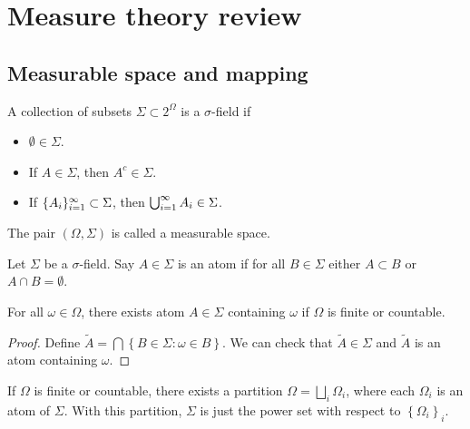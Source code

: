 \documentclass[a4paper]{article}
\author{Notes taken by \nauthor\vspace{5pt}\\
Lectures by Konstantin Tikhomirov\vspace{5pt}\\
Carnegie Mellon University}
\begin{document}
\maketitle

\tableofcontents

\section{Measure theory review}

\subsection{Measurable space and mapping}

\begin{defi}
  A collection of subsets $\Sigma \subset 2^{\Omega}$ is a $\sigma$-field if
  \begin{itemize}
    \item $\emptyset \in \Sigma$.
    \item If $A \in \Sigma$, then $A^c \in \Sigma$.
    \item If $\{ A_i \}_{i=1}^\infty \subset \Sigma$, then $\bigcup_{i=1}^\infty A_i \in \Sigma$.
  \end{itemize}
  The pair $(\Omega, \Sigma)$ is called a measurable space.
\end{defi}

\begin{defi}[atom]
Let $\Sigma$ be a $\sigma$-field. Say $A \in \Sigma$ is an atom
if for all $B \in \Sigma$ either $A \subset B$ or $A \cap B = \emptyset$.
\end{defi}

\begin{prop}
For all $\omega \in \Omega$, there exists atom $A \in \Sigma$ containing
$\omega$ if $\Omega$ is finite or countable.
\end{prop}

\begin{proof}
  Define $\tilde{A} = \bigcap \left\{ B \in \Sigma :
  \omega \in B \right\}$. We can check that $\tilde{A} \in \Sigma$
  and $\tilde{A}$ is an atom containing $\omega$.

\end{proof}

\begin{cor}
If $\Omega$ is finite or countable, there exists a partition
$\Omega = \bigsqcup_i \Omega_i$,
where each $\Omega_i$ is an atom of $\Sigma$. With this partition,
$\Sigma$ is just the power set with respect to $\left\{ \Omega_i \right\}_i$.
\end{cor}
\end{document}
